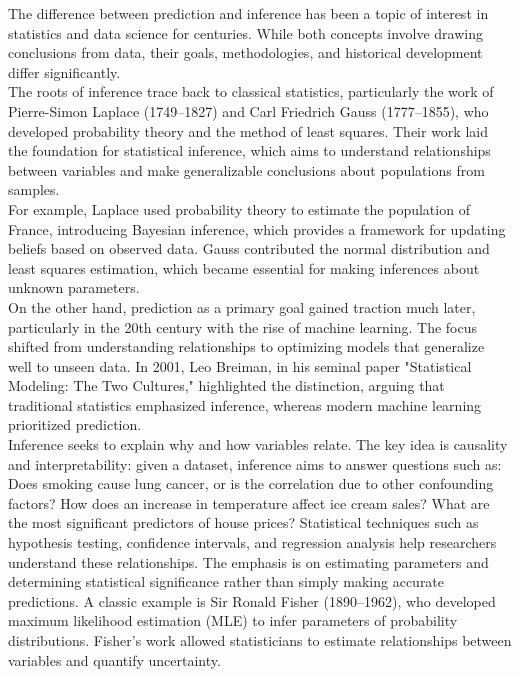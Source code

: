 \documentclass{book}
\begin{document}
The difference between prediction and inference has been a topic of interest in statistics and data science for centuries. While both concepts involve drawing conclusions from data, their goals, methodologies, and historical development differ significantly.\\

The roots of inference trace back to classical statistics, particularly the work of Pierre-Simon Laplace (1749–1827) and Carl Friedrich Gauss (1777–1855), who developed probability theory and the method of least squares. Their work laid the foundation for statistical inference, which aims to understand relationships between variables and make generalizable conclusions about populations from samples.\\

For example, Laplace used probability theory to estimate the population of France, introducing Bayesian inference, which provides a framework for updating beliefs based on observed data. Gauss contributed the normal distribution and least squares estimation, which became essential for making inferences about unknown parameters.\\

On the other hand, prediction as a primary goal gained traction much later, particularly in the 20th century with the rise of machine learning. The focus shifted from understanding relationships to optimizing models that generalize well to unseen data. In 2001, Leo Breiman, in his seminal paper "Statistical Modeling: The Two Cultures," highlighted the distinction, arguing that traditional statistics emphasized inference, whereas modern machine learning prioritized prediction.\\

Inference seeks to explain why and how variables relate. The key idea is causality and interpretability: given a dataset, inference aims to answer questions such as: Does smoking cause lung cancer, or is the correlation due to other confounding factors? How does an increase in temperature affect ice cream sales? What are the most significant predictors of house prices? Statistical techniques such as hypothesis testing, confidence intervals, and regression analysis help researchers understand these relationships. The emphasis is on estimating parameters and determining statistical significance rather than simply making accurate predictions. A classic example is Sir Ronald Fisher (1890–1962), who developed maximum likelihood estimation (MLE) to infer parameters of probability distributions. Fisher’s work allowed statisticians to estimate relationships between variables and quantify uncertainty.\\
\end{document}

